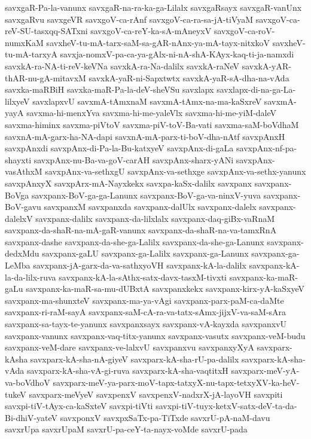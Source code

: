{savxgaR-Pa-la-vanunx
savxgaR-na-ra-ka-ga-Lilalx
savxgaRsayx
savxgaR-vanUnx
savxgaRvu
savxgeVR
savxgoV-ca-rAnf
savxgoV-ca-ra-sa-jA-tiVyaM
savxgoV-ca-reV-SU-tasxqq-SATxni
savxgoV-ca-reY-ka-sA-mAneyxV
savxgoV-ca-roV-numxKaM
savxheV-tu-mA-tarx-saM-sa-gAR-nAnx-ya-mA-tayx-nitxkoV
savxheV-tu-mA-tarxyA
savxja-nomxV-pa-ca-ya-gAlx-ni-nA-shA-KAyx-kaq-ti-ja-namxdi
savxkA-ra-NA-ti-reV-keVNa
savxkA-ra-Na-dalilx
savxkA-raNeV
savxkA-yAR-thAR-nu-gA-mitavxM
savxkA-yaR-ni-Sapxtwtx
savxkA-yaR-sA-dha-na-vAda
savxka-maRBiH
savxka-maR-Pa-la-deV-sheVSu
savxlapx
savxlapx-di-na-ga-La-lilxyeV
savxlapxvU
savxmA-tAmxnaM
savxmA-tAmx-na-ma-kaSxreV
savxmA-yayA
savxma-hi-menxYva
savxma-hi-me-yaleVlx
savxma-hi-me-yiM-daleV
savxma-himinx
savxma-piVtoV
savxma-piV-toV-Ba-vati
savxma-saM-boVdhaM
savxnA-mA-garx-ha-NA-dapi
savxnA-mA-parx-ti-boV-dha-nAtf
savxpAnxH
savxpAnxdi
savxpAnx-di-Pa-la-Bu-katxyeV
savxpAnx-di-gaLa
savxpAnx-nf-pa-shayxti
savxpAnx-nu-Ba-va-goV-carAH
savxpAnx-sharx-yANi
savxpAnx-vasAthxM
savxpAnx-va-sethxgU
savxpAnx-va-sethxge
savxpAnx-va-sethx-yanunx
savxpAnxyX
savxpArx-mA-Nayxkekx
savxpa-kaSx-dalilx
savxpanx
savxpanx-BoVga
savxpanx-BoV-ga-ga-Lanunx
savxpanx-BoV-ga-va-ninxV-yuva
savxpanx-BoV-gavu
savxpanxM
savxpanxda
savxpanx-dalUlx
savxpanx-dalelx
savxpanx-dalelxV
savxpanx-dalilx
savxpanx-da-lilxlalx
savxpanx-daq-giBx-vaRnaM
savxpanx-da-shaR-na-mA-gaR-vanunx
savxpanx-da-shaR-na-va-tamxRnA
savxpanx-dashe
savxpanx-da-she-ga-Lalilx
savxpanx-da-she-ga-Lanunx
savxpanx-dedxMdu
savxpanx-gaLU
savxpanx-ga-Lalilx
savxpanx-ga-Lanunx
savxpanx-ga-LeMba
savxpanx-jA-garx-da-va-sathxyoVH
savxpanx-kA-la-dalilx
savxpanx-kA-la-da-lilx-ruva
savxpanx-kA-la-sAthx-satx-davx-tasxM-tivxti
savxpanx-ka-maR-gaLu
savxpanx-ka-maR-sa-mu-dUBxtA
savxpanxkekx
savxpanx-kirx-yA-kaSxyeV
savxpanx-ma-shunxteV
savxpanx-ma-ya-vAgi
savxpanx-parx-paM-ca-daMte
savxpanx-ri-raM-sayA
savxpanx-saM-cA-ra-va-tatx-sAmx-jijxV-va-saM-sAra
savxpanx-sa-tayx-te-yanunx
savxpanxsayx
savxpanx-vA-kayxda
savxpanxvU
savxpanx-vanunx
savxpanx-vaq-titx-yanunx
savxpanx-vasutx
savxpanx-veM-budu
savxpanx-veM-dare
savxpanx-ve-lalxvU
savxpanxvu
savxpanxyXyA
savxparx-kAsha
savxparx-kA-sha-nA-giyeV
savxparx-kA-sha-rU-pa-dalilx
savxparx-kA-sha-vAda
savxparx-kA-sha-vA-gi-ruva
savxparx-kA-sha-vaqtitxH
savxparx-meV-yA-va-boVdhoV
savxparx-meV-ya-parx-moV-tapx-tatxyX-nu-tapx-tetxyXV-ka-heV-tukeV
savxparx-meVyeV
savxpenxV
savxpenxV-nadxrX-jA-layoVH
savxpiti
savxpi-tiV-tAyx-ca-kaSxteV
savxpi-tiVti
savxpi-tiV-tuyx-ketxV-satx-deV-ta-da-Bi-dhiV-yateV
savxponxV
savxpxSaTx-pa-TiTxde
savxrU-pA-naM-davu
savxrUpa
savxrUpaM
savxrU-pa-ceY-ta-nayx-voMde
savxrU-pada
}
